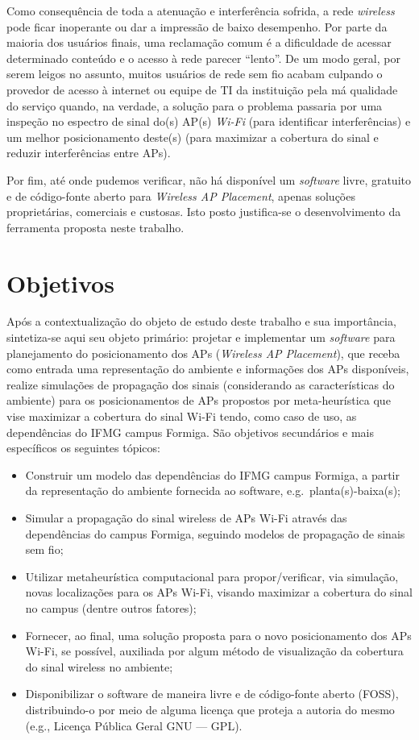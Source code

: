 \documentclass[
	12pt,				%
	twoside,			%
	a4paper,			%
	english,			%
	french,				%
	spanish,			%
	brazil				%
	]{abntex2}
\begin{document}
Como consequência de toda a atenuação e interferência sofrida, a rede
\emph{wireless} pode ficar inoperante ou dar a impressão de baixo
desempenho. Por parte da maioria dos usuários finais, uma reclamação
comum é a dificuldade de acessar determinado conteúdo e o acesso à rede
parecer ``lento''. De um modo geral, por serem leigos no assunto, muitos
usuários de rede sem fio acabam culpando o provedor de acesso à internet
ou equipe de TI da instituição pela má qualidade do serviço quando, na
verdade, a solução para o problema passaria por uma inspeção no espectro
de sinal do(s) AP(s) \emph{Wi-Fi} (para identificar interferências) e um
melhor posicionamento deste(s) (para maximizar a cobertura do sinal e
reduzir interferências entre APs).

Por fim, até onde pudemos verificar, não há disponível um
\emph{software} livre, gratuito e de código-fonte aberto para
\emph{Wireless AP Placement}, apenas soluções proprietárias, comerciais
e custosas. Isto posto justifica-se o desenvolvimento da ferramenta
proposta neste trabalho.

\section{Objetivos}\label{objetivos}

Após a contextualização do objeto de estudo deste trabalho e sua
importância, sintetiza-se aqui seu objeto primário: projetar e
implementar um \emph{software} para planejamento do posicionamento dos
APs (\emph{Wireless AP Placement}), que receba como entrada uma
representação do ambiente e informações dos APs disponíveis, realize
simulações de propagação dos sinais (considerando as características do
ambiente) para os posicionamentos de APs propostos por meta-heurística
que vise maximizar a cobertura do sinal Wi-Fi tendo, como caso de uso,
as dependências do IFMG campus Formiga. São objetivos secundários e mais
específicos os seguintes tópicos:

\begin{itemize}
\item
  Construir um modelo das dependências do IFMG campus Formiga, a partir
  da representação do ambiente fornecida ao software,
  e.g.~planta(s)-baixa(s);
\item
  Simular a propagação do sinal wireless de APs Wi-Fi através das
  dependências do campus Formiga, seguindo modelos de propagação de
  sinais sem fio;
\item
  Utilizar metaheurística computacional para propor/verificar, via
  simulação, novas localizações para os APs Wi-Fi, visando maximizar a
  cobertura do sinal no campus (dentre outros fatores);
\item
  Fornecer, ao final, uma solução proposta para o novo posicionamento
  dos APs Wi-Fi, se possível, auxiliada por algum método de visualização
  da cobertura do sinal wireless no ambiente;
\item
  Disponibilizar o software de maneira livre e de código-fonte aberto
  (FOSS), distribuindo-o por meio de alguma licença que proteja a
  autoria do mesmo (e.g., Licença Pública Geral GNU --- GPL).
\end{itemize}
\end{document}
